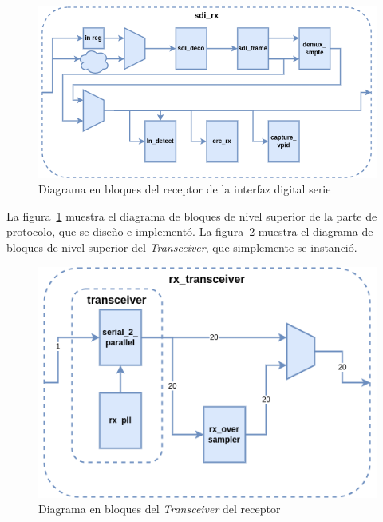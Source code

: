   \vspace{1cm}
  \begin{figure}[htbp]
      \centering
      \includegraphics[width=\linewidth]{./Figures/sdi_rx.png}
      \caption{Diagrama en bloques del receptor de la interfaz digital serie}\label{fig:sdi_rx}
  \end{figure}
  \vspace{1cm}

  La figura~\ref{fig:sdi_rx} muestra el diagrama de bloques de nivel superior de
  la parte de protocolo, que se diseño e implementó. La figura~\ref{fig:rx_xcvr}
  muestra el diagrama de bloques de nivel superior del \textit{Transceiver}, que
  simplemente se instanció.

  \vspace{1cm}
  \begin{figure}[htbp]
      \centering
      \includegraphics[width=\linewidth]{./Figures/rx_xcvr.png}
      \caption{Diagrama en bloques del \textit{Transceiver} del receptor}\label{fig:rx_xcvr}
  \end{figure}
  \vspace{1cm}

